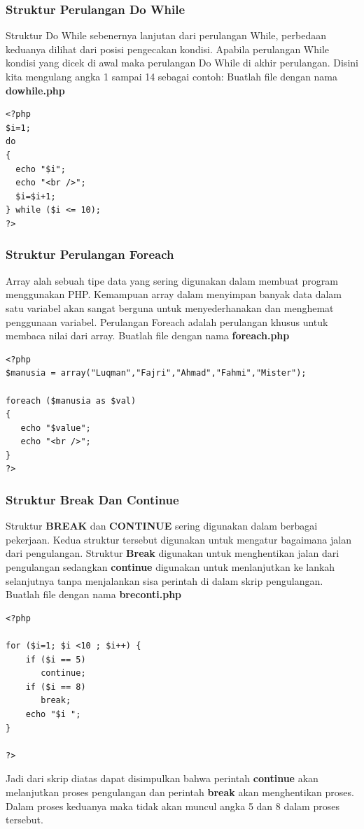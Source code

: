 \subsubsection{Struktur Perulangan Do While}
Struktur Do While sebenernya lanjutan dari perulangan While, perbedaan keduanya dilihat dari posisi pengecakan kondisi. Apabila perulangan While kondisi yang dicek di awal maka perulangan Do While di akhir perulangan. Disini kita mengulang angka  1 sampai 14 sebagai contoh:  Buatlah file dengan nama \textbf{dowhile.php}
\begin{lstlisting}
<?php
$i=1;
do
{
  echo "$i";
  echo "<br />";
  $i=$i+1;
} while ($i <= 10);
?>
\end{lstlisting}

\subsubsection{Struktur Perulangan Foreach}
Array alah sebuah tipe data yang sering digunakan dalam membuat program menggunakan PHP. Kemampuan array dalam menyimpan banyak data dalam satu variabel akan sangat berguna untuk menyederhanakan dan menghemat penggunaan variabel. Perulangan Foreach adalah perulangan khusus untuk membaca nilai dari array. Buatlah file dengan nama \textbf{foreach.php}
\begin{lstlisting}
<?php
$manusia = array("Luqman","Fajri","Ahmad","Fahmi","Mister");

foreach ($manusia as $val)
{
   echo "$value";
   echo "<br />";
}
?>
\end{lstlisting}

\subsubsection{Struktur Break Dan Continue}
Struktur \textbf{BREAK} dan \textbf{CONTINUE} sering digunakan dalam berbagai pekerjaan. Kedua struktur tersebut digunakan untuk mengatur bagaimana jalan dari pengulangan. Struktur \textbf{Break} digunakan untuk menghentikan jalan dari pengulangan sedangkan \textbf{continue} digunakan untuk menlanjutkan ke lankah selanjutnya tanpa menjalankan sisa perintah di dalam skrip pengulangan. Buatlah file dengan nama \textbf{breconti.php}
\begin{lstlisting}
<?php
 
for ($i=1; $i <10 ; $i++) {
    if ($i == 5)
       continue;
    if ($i == 8)
       break;
    echo "$i ";
}
 
?>
\end{lstlisting}
Jadi dari skrip diatas dapat disimpulkan bahwa perintah  \textbf{continue} akan melanjutkan proses pengulangan dan perintah \textbf{break} akan menghentikan proses. Dalam proses keduanya maka tidak akan muncul angka 5 dan 8 dalam proses tersebut.

